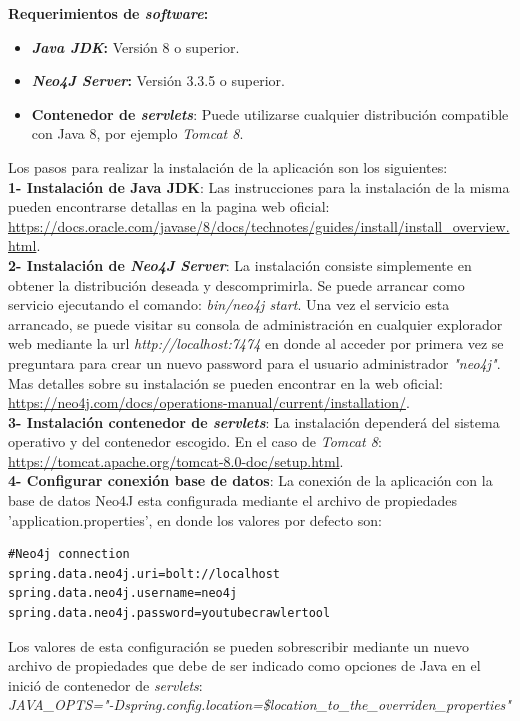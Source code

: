 \documentclass[11pt,a4paper]{article}
\begin{document}
\noindent\textbf{Requerimientos de \textit{software}:}
\begin{itemize}
\item \textbf{\textit{Java JDK}:} Versión 8 o superior.
\item \textbf{\textit{Neo4J Server}:} Versión 3.3.5 o superior.
\item \textbf{Contenedor de \textit{servlets}}: Puede utilizarse cualquier distribución compatible con Java 8, por ejemplo \textit{Tomcat 8}.
\end{itemize}
\bigskip 

Los pasos para realizar la instalación de la aplicación son los siguientes:
\\

\noindent\textbf{1- Instalación de Java JDK}: Las instrucciones para la instalación de la misma pueden encontrarse detallas en la pagina web oficial: \url{https://docs.oracle.com/javase/8/docs/technotes/guides/install/install_overview.html}.
\\

\noindent\textbf{2- Instalación de \textit{Neo4J Server}}: La instalación consiste simplemente en obtener la distribución deseada y descomprimirla. Se puede arrancar como servicio ejecutando el comando: \textit{bin/neo4j start}. Una vez el servicio esta arrancado, se puede visitar su consola de administración en cualquier explorador web mediante la url  \textit{http://localhost:7474} en donde al acceder por primera vez se preguntara para crear un nuevo password para el usuario administrador \textit{"neo4j"}. Mas detalles sobre su instalación se pueden encontrar en la web oficial: \url{https://neo4j.com/docs/operations-manual/current/installation/}.
\\

\noindent\textbf{3- Instalación contenedor de \textit{servlets}}: La instalación dependerá del sistema operativo y del contenedor escogido. En el caso de \textit{Tomcat 8}: \url{https://tomcat.apache.org/tomcat-8.0-doc/setup.html}.\\

\noindent\textbf{4- Configurar conexión base de datos}: La conexión de la aplicación con la base de datos Neo4J esta configurada mediante el archivo de propiedades 'application.properties', en donde los valores por defecto son:
\begin{lstlisting}[style=C]
#Neo4j connection
spring.data.neo4j.uri=bolt://localhost
spring.data.neo4j.username=neo4j
spring.data.neo4j.password=youtubecrawlertool
\end{lstlisting}
Los valores de esta configuración se pueden sobrescribir mediante un nuevo archivo de propiedades que debe de ser indicado como opciones de Java en el inició de contenedor de \textit{servlets}:\\
\textit{JAVA\_OPTS="\--Dspring.config.location=\$location\_to\_the\_overriden\_properties"}
\\
\end{document}
